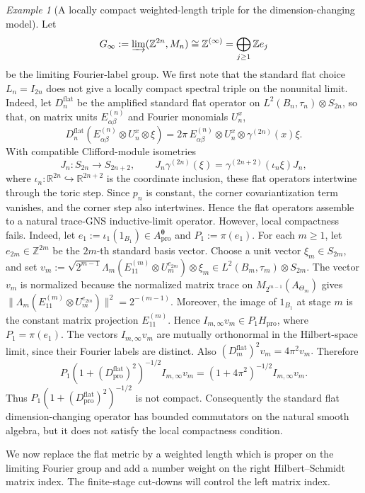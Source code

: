\documentclass[11pt]{amsart}
\theoremstyle{definition}
\theoremstyle{remark}
\newtheorem{example}[theorem]{Example}
\newcommand{\Z}{\mathbb{Z}}
\newcommand{\R}{\mathbb{R}}
\newcommand{\ex}{\mathrm{pro}}
\begin{document}
\begin{example}[A locally compact weighted-length triple for the dimension-changing model]
Let \[G_\infty
:=
\varinjlim(\Z^{2n},M_n)
\cong
\Z^{(\infty)}
=
\bigoplus_{j\geq1}\Z e_j\]
be the limiting Fourier-label group. We first note that the standard
flat choice $L_n=I_{2n}$
does not give a locally compact spectral triple on the nonunital limit. Indeed,
let $D_n^{\mathrm{flat}}$ be the amplified standard flat operator on $L^2(B_n,\tau_n)\otimes S_{2n}$,
so that, on matrix units $E_{\alpha\beta}^{(n)}$ and Fourier monomials
$U_n^x$,
\[
D_n^{\mathrm{flat}}
(E_{\alpha\beta}^{(n)}\otimes U_n^x\otimes\xi)
=
2\pi\,E_{\alpha\beta}^{(n)}\otimes U_n^x
\otimes \gamma^{(2n)}(x)\xi.
\]
With compatible Clifford-module isometries 
\[
J_n\colon S_{2n}\to S_{2n+2},
\qquad
J_n\gamma^{(2n)}(\xi)
=
\gamma^{(2n+2)}(\iota_n\xi)J_n,
\]
where $\iota_n\colon\R^{2n}\hookrightarrow\R^{2n+2}$ is the coordinate
inclusion, these flat operators intertwine through the toric step. Since
$p_n$ is constant, the corner covariantization term vanishes, and the corner
step also intertwines. Hence the flat operators assemble to a natural
trace-GNS inductive-limit operator. However, local compactness fails. Indeed, let $e_1:=\iota_1(1_{B_1})\in A_{\ex}^{\boldsymbol\theta}$ and $P_1:=\pi(e_1)$.
For each $m\geq1$, let $e_{2m}\in\Z^{2m}$ be the $2m$-th standard basis
vector. Choose a unit vector $\xi_m\in S_{2m}$, and set $v_m:=\sqrt{2^{m-1}}
\Lambda_m(E_{11}^{(m)}\otimes U_m^{e_{2m}})
\otimes \xi_m
\in L^2(B_m,\tau_m)\otimes S_{2m}.$
The vector $v_m$ is normalized because the normalized matrix trace on
$M_{2^{m-1}}(A_{\Theta_m})$ gives $\|\Lambda_m(E_{11}^{(m)}\otimes U_m^{e_{2m}})\|^2=2^{-(m-1)}$. Moreover, the image of $1_{B_1}$ at stage $m$ is the constant matrix
projection $E_{11}^{(m)}$. Hence $I_{m,\infty}v_m\in P_1H_{\ex}$, where
$P_1=\pi(e_1)$. The vectors
$I_{m,\infty}v_m$ are mutually orthonormal in the Hilbert-space limit, since
their Fourier labels are distinct. Also $(D_m^{\mathrm{flat}})^2v_m=4\pi^2v_m.$
Therefore
\[
P_1(1+(D_{\ex}^{\mathrm{flat}})^2)^{-1/2}I_{m,\infty}v_m
=
(1+4\pi^2)^{-1/2}I_{m,\infty}v_m.
\]
Thus $P_1(1+(D_{\ex}^{\mathrm{flat}})^2)^{-1/2}$
is not compact. Consequently the standard flat dimension-changing operator has
bounded commutators on the natural smooth algebra, but it does not satisfy the
local compactness condition.

We now replace the flat metric by a weighted length which is proper on the
limiting Fourier group and add a number weight on the right Hilbert--Schmidt
matrix index. The finite-stage cut-downs will control the left matrix index.


\end{example}
\end{document}

